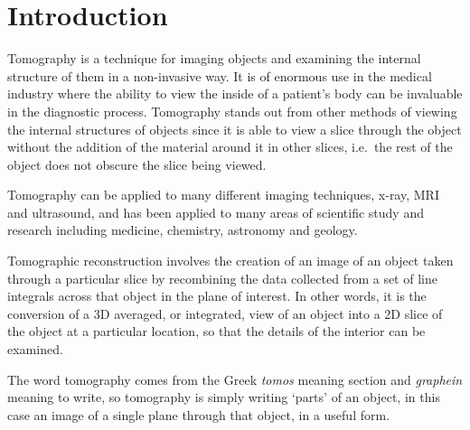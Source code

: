 
\section{Introduction} %
\label{sec:introduction}
	Tomography is a technique for imaging objects and examining the internal structure of them in a non-invasive way. It is of enormous use in the medical industry where the ability to view the inside of a patient's body can be invaluable in the diagnostic process. Tomography stands out from other methods of viewing the internal structures of objects since it is able to view a slice through the object without the addition of the material around it in other slices, i.e.\ the rest of the object does not obscure the slice being viewed.

    Tomography can be applied to many different imaging techniques, x-ray, MRI and ultrasound, and has been applied to many areas of scientific study and research including medicine, chemistry, astronomy and geology.

    Tomographic reconstruction involves the creation of an image of an object taken through a particular slice by recombining the data collected from a set of line integrals across that object in the plane of interest. In other words, it is the conversion of a 3D averaged, or integrated, view of an object into a 2D slice of the object at a particular location, so that the details of the interior can be examined.

    The word tomography comes from the Greek \textit{tomos} meaning section and \textit{graphein} meaning to write, so tomography is simply writing `parts' of an object, in this case an image of a single plane through that object, in a useful form.

